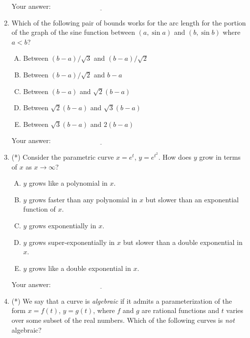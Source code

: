 \documentclass[10pt]{amsart}
\begin{document}
\begin{enumerate}
  \vspace{0.1in}
  Your answer: $\underline{\qquad\qquad\qquad\qquad\qquad\qquad\qquad}$
  \vspace{0.6in}

\item Which of the following pair of bounds works for the arc length
  for the portion of the graph of the sine function between $(a,\sin
  a)$ and $(b, \sin b)$ where $a < b$?

  \begin{enumerate}[(A)]
  \item Between $(b - a)/\sqrt{3}$ and $(b - a)/\sqrt{2}$
  \item Between $(b - a)/\sqrt{2}$ and $b - a$
  \item Between $(b - a)$ and $\sqrt{2}(b - a)$
  \item Between $\sqrt{2}(b - a)$ and $\sqrt{3}(b - a)$
  \item Between $\sqrt{3}(b - a)$ and $2(b - a)$
  \end{enumerate}

  \vspace{0.1in}
  Your answer: $\underline{\qquad\qquad\qquad\qquad\qquad\qquad\qquad}$
  \vspace{0.6in}

\item (*) Consider the parametric curve $x = e^t$, $y = e^{t^2}$. How does
  $y$ grow in terms of $x$ as $x \to \infty$?

  \begin{enumerate}[(A)]
  \item $y$ grows like a polynomial in $x$.
  \item $y$ grows faster than any polynomial in $x$ but slower than an
    exponential function of $x$.
  \item $y$ grows exponentially in $x$.
  \item $y$ grows super-exponentially in $x$ but slower than a double
    exponential in $x$.
  \item $y$ grows like a double exponential in $x$.
  \end{enumerate}

  \vspace{0.1in}
  Your answer: $\underline{\qquad\qquad\qquad\qquad\qquad\qquad\qquad}$
  \vspace{0.6in}

\item (*) We say that a curve is {\em algebraic} if it admits a
  parameterization of the form $x = f(t)$, $y = g(t)$, where $f$ and
  $g$ are rational functions and $t$ varies over some subset of the real
  numbers. Which of the following curves is {\em not} algebraic?


\end{enumerate}
\end{document}
